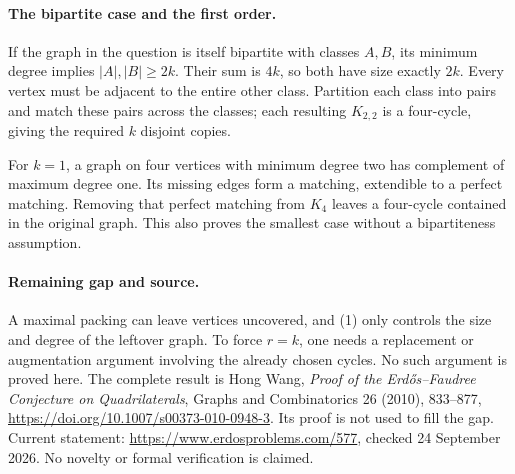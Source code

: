 \paragraph{The bipartite case and the first order.}
If the graph in the question is itself bipartite with classes \(A,B\), its minimum degree implies \(|A|,|B|\geq2k\). Their sum is \(4k\), so both have size exactly \(2k\). Every vertex must be adjacent to the entire other class. Partition each class into pairs and match these pairs across the classes; each resulting \(K_{2,2}\) is a four-cycle, giving the required \(k\) disjoint copies.

For \(k=1\), a graph on four vertices with minimum degree two has complement of maximum degree one. Its missing edges form a matching, extendible to a perfect matching. Removing that perfect matching from \(K_4\) leaves a four-cycle contained in the original graph. This also proves the smallest case without a bipartiteness assumption.

\paragraph{Remaining gap and source.}
A maximal packing can leave vertices uncovered, and (1) only controls the size and degree of the leftover graph. To force \(r=k\), one needs a replacement or augmentation argument involving the already chosen cycles. No such argument is proved here. The complete result is Hong Wang, \emph{Proof of the Erd\H{o}s--Faudree Conjecture on Quadrilaterals}, Graphs and Combinatorics 26 (2010), 833--877, \url{https://doi.org/10.1007/s00373-010-0948-3}. Its proof is not used to fill the gap. Current statement: \url{https://www.erdosproblems.com/577}, checked 24 September 2026. No novelty or formal verification is claimed.
